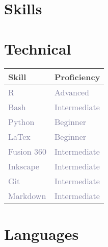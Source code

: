 \documentclass[11pt,a4paper,]{awesome-cv}
\begin{document}
\section{\texorpdfstring{ Skills}{ Skills}}\label{skills}

\smallskip

\section{\texorpdfstring{
Technical}{ Technical}}\label{technical}

\begin{table}[H]
\centering\begingroup\fontsize{10}{12}\selectfont

\begin{tabular}{>{\centering\arraybackslash}p{3.75cm}>{\centering\arraybackslash}p{3.75cm}}
\toprule
\begingroup\fontsize{12}{14}\selectfont \textcolor[HTML]{414141}{\textbf{Skill}}\endgroup & \begingroup\fontsize{12}{14}\selectfont \textcolor[HTML]{414141}{\textbf{Proficiency}}\endgroup\\
\midrule
\textcolor[HTML]{7f7f9f}{R} & \textcolor[HTML]{7f7f9f}{Advanced}\\
\textcolor[HTML]{7f7f9f}{Bash} & \textcolor[HTML]{7f7f9f}{Intermediate}\\
\textcolor[HTML]{7f7f9f}{Python} & \textcolor[HTML]{7f7f9f}{Beginner}\\
\textcolor[HTML]{7f7f9f}{LaTex} & \textcolor[HTML]{7f7f9f}{Beginner}\\
\textcolor[HTML]{7f7f9f}{Fusion 360} & \textcolor[HTML]{7f7f9f}{Intermediate}\\
\addlinespace
\textcolor[HTML]{7f7f9f}{Inkscape} & \textcolor[HTML]{7f7f9f}{Intermediate}\\
\textcolor[HTML]{7f7f9f}{Git} & \textcolor[HTML]{7f7f9f}{Intermediate}\\
\textcolor[HTML]{7f7f9f}{Markdown} & \textcolor[HTML]{7f7f9f}{Intermediate}\\
\bottomrule
\end{tabular}
\endgroup{}
\end{table}

\section{\texorpdfstring{
Languages}{ Languages}}\label{languages}
\end{document}
